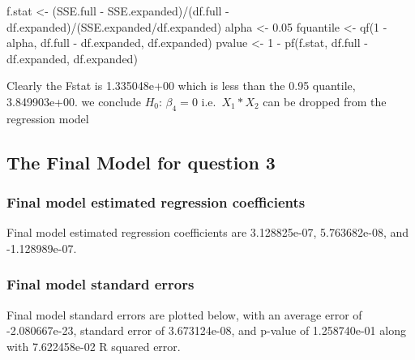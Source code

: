 \documentclass[
  12pt,
]{article}
\newenvironment{Shaded}{\begin{snugshade}}{\end{snugshade}}
\newcommand{\DecValTok}[1]{\textcolor[rgb]{0.00,0.00,0.81}{#1}}
\newcommand{\FloatTok}[1]{\textcolor[rgb]{0.00,0.00,0.81}{#1}}
\newcommand{\FunctionTok}[1]{\textcolor[rgb]{0.00,0.00,0.00}{#1}}
\newcommand{\NormalTok}[1]{#1}
\newcommand{\OtherTok}[1]{\textcolor[rgb]{0.56,0.35,0.01}{#1}}
\newcommand{\SpecialCharTok}[1]{\textcolor[rgb]{0.00,0.00,0.00}{#1}}
\begin{document}
\begin{Shaded}
\begin{Highlighting}[]
\NormalTok{f.stat }\OtherTok{\textless{}{-}}\NormalTok{ (SSE.full }\SpecialCharTok{{-}}\NormalTok{ SSE.expanded)}\SpecialCharTok{/}\NormalTok{(df.full }\SpecialCharTok{{-}}\NormalTok{ df.expanded)}\SpecialCharTok{/}\NormalTok{(SSE.expanded}\SpecialCharTok{/}\NormalTok{df.expanded)}
\NormalTok{alpha }\OtherTok{\textless{}{-}} \FloatTok{0.05}
\NormalTok{fquantile }\OtherTok{\textless{}{-}} \FunctionTok{qf}\NormalTok{(}\DecValTok{1} \SpecialCharTok{{-}}\NormalTok{ alpha, df.full }\SpecialCharTok{{-}}\NormalTok{ df.expanded, df.expanded)}
\NormalTok{pvalue }\OtherTok{\textless{}{-}} \DecValTok{1} \SpecialCharTok{{-}} \FunctionTok{pf}\NormalTok{(f.stat, df.full }\SpecialCharTok{{-}}\NormalTok{ df.expanded, df.expanded)}
\end{Highlighting}
\end{Shaded}

Clearly the Fstat is 1.335048e+00 which is less than the 0.95 quantile,
3.849903e+00. we conclude \(H_{0}\): \(\beta_{4} = 0\)
i.e.~\(X_{1} * X_{2}\) can be dropped from the regression model

\hypertarget{the-final-model-for-question-3}{%
\subsection{The Final Model for question
3}\label{the-final-model-for-question-3}}

\hypertarget{final-model-estimated-regression-coefficients-2}{%
\subsubsection{Final model estimated regression
coefficients}\label{final-model-estimated-regression-coefficients-2}}

Final model estimated regression coefficients are 3.128825e-07,
5.763682e-08, and -1.128989e-07.

\hypertarget{final-model-standard-errors-2}{%
\subsubsection{Final model standard
errors}\label{final-model-standard-errors-2}}

Final model standard errors are plotted below, with an average error of
-2.080667e-23, standard error of 3.673124e-08, and p-value of
1.258740e-01 along with 7.622458e-02 R squared error.
\end{document}

